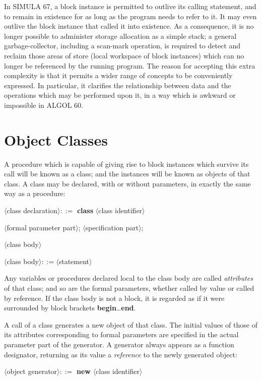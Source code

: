 In SIMULA 67, a block instance is permitted to outlive its calling statement, and to remain in existence for as long as the program needs to refer to it. It may even outlive the block instance that called it into existence. As a consequence, it is no longer possible to administer storage allocation as a simple stack; a general garbage-collector, including a scan-mark operation, is required to detect and reclaim those areas of store (local workspace of block instances) which can no longer be referenced by the running program. The reason for accepting this extra complexity is that it permits a wider range of concepts to be conveniently expressed. In particular, it clarifies the relationship between data and the operations which may be performed upon it, in a way which is awkward or impossible in ALGOL 60.

\section[Object classes]{Object Classes}

A procedure which is capable of giving rise to block instances which survive its call will be known as a class; and the instances will be known as objects of that class. A class may be declared, with or without parameters, in exactly the same way as a procedure: 

\quad $\langle$class declaration$\rangle ::=$ \textbf{class} $\langle$class identifier$\rangle$

\tabto*{11.6em}$\langle$formal parameter part$\rangle$; $\langle$specification part$\rangle$;

\tabto*{11.6em}$\langle$class body$\rangle$

\quad $\langle$class body$\rangle ::= \langle$statement$\rangle$

Any variables or procedures declared local to the class body are called \textit{attributes} of that class; and so are the formal parameters, whether called by
value or called by reference. If the class body is not a block, it is regarded as if it were surrounded by block brackets \textbf{begin}\dots\textbf{end}.

A call of a class generates a new object of that class. The initial values of those of its attributes corresponding to formal parameters are specified in the actual parameter part of the generator. A generator always appears as a function designator, returning as its value a \textit{reference} to the newly generated object:

\quad $\langle$object generator$\rangle ::=$ \textbf{new} $\langle$class identifier$\rangle$

